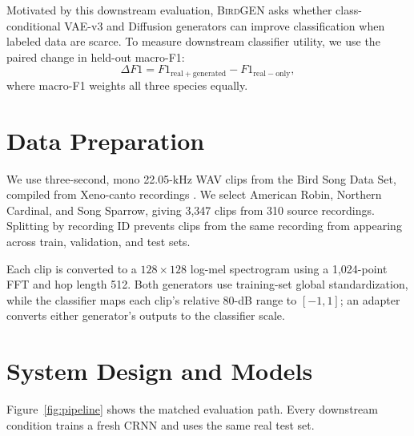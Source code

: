 \documentclass{article}
\begin{document}
Motivated by this downstream evaluation, \textsc{BirdGEN} asks whether
class-conditional VAE-v3 and Diffusion generators can improve classification
when labeled data are scarce. To measure downstream classifier utility, we use
the paired change in held-out macro-F1:
\[
\Delta F1 =
F1_{\mathrm{real+generated}} - F1_{\mathrm{real-only}},
\]
where macro-F1 weights all three species equally.

\section{Data Preparation}

We use three-second, mono 22.05-kHz WAV clips from the Bird Song Data Set,
compiled from Xeno-canto recordings \cite{shanbhagBirdSongDataset}. We select
American Robin, Northern Cardinal, and Song Sparrow, giving 3,347 clips from
310 source recordings. Splitting by recording ID prevents clips from the same
recording from appearing across train, validation, and test sets.

Each clip is converted to a $128\times128$ log-mel spectrogram using a
1,024-point FFT and hop length 512. Both generators use training-set
global standardization, while the classifier maps each clip's relative 80-dB
range to $[-1,1]$; an adapter converts either generator’s outputs to the
classifier scale.

\section{System Design and Models}

Figure~\ref{fig:pipeline} shows the matched evaluation path. Every downstream
condition trains a fresh CRNN and uses the same real test set.
\end{document}
